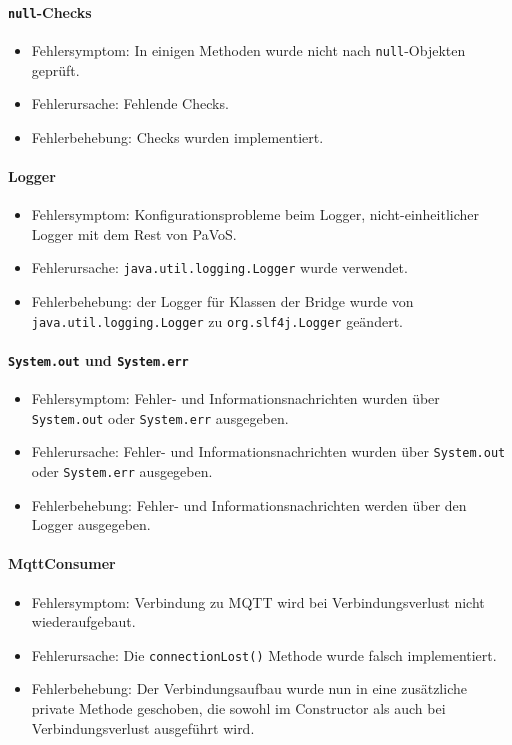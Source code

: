 \paragraph{\texttt{null}-Checks}
\begin{itemize}
	\item Fehlersymptom: In einigen Methoden wurde nicht nach \texttt{null}-Objekten geprüft.
	\item Fehlerursache: Fehlende Checks.
	\item Fehlerbehebung: Checks wurden implementiert.
\end{itemize}

\paragraph{Logger}
\begin{itemize}
	\item Fehlersymptom: Konfigurationsprobleme beim Logger, nicht-einheitlicher Logger mit dem Rest von PaVoS.
	\item Fehlerursache: \texttt{java.util.logging.Logger} wurde verwendet.
	\item Fehlerbehebung: der Logger für Klassen der Bridge wurde von \texttt{java.util.logging.Logger} zu \texttt{org.slf4j.Logger} geändert.
\end{itemize}

\paragraph{\texttt{System.out} und \texttt{System.err}}
\begin{itemize}
	\item Fehlersymptom: Fehler- und Informationsnachrichten wurden über \texttt{System.out} oder \texttt{System.err} ausgegeben.
	\item Fehlerursache: Fehler- und Informationsnachrichten wurden über \texttt{System.out} oder \texttt{System.err} ausgegeben.
	\item Fehlerbehebung: Fehler- und Informationsnachrichten werden über den Logger ausgegeben.
\end{itemize}

\paragraph{MqttConsumer}
\begin{itemize}
	\item Fehlersymptom: Verbindung zu MQTT wird bei Verbindungsverlust nicht wiederaufgebaut.
	\item Fehlerursache: Die \texttt{connectionLost()} Methode wurde falsch implementiert.
	\item Fehlerbehebung: Der Verbindungsaufbau wurde nun in eine zusätzliche private Methode geschoben, die sowohl im Constructor als auch bei Verbindungsverlust ausgeführt wird.
\end{itemize}

